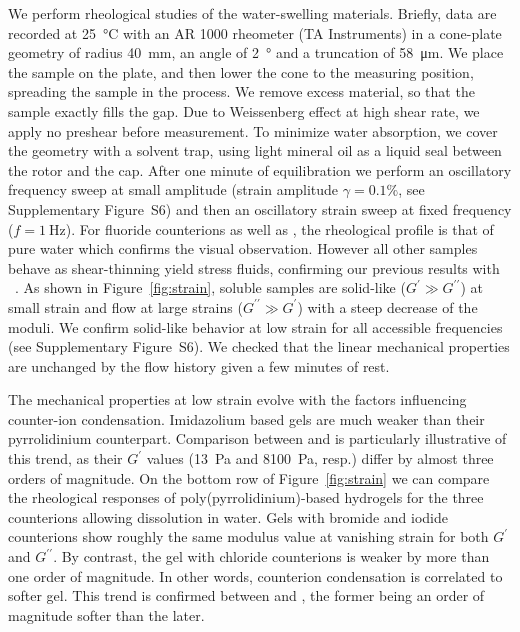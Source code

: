 \documentclass[twoside,twocolumn,9pt]{article}
\newcommand{\figSfrequency}{S6\xspace}
\begin{document}
We perform rheological studies of the water-swelling materials. Briefly, data are recorded at \SI{25}{\celsius} with an AR 1000 rheometer (TA Instruments) in a cone-plate geometry of radius \SI{40}{\milli\metre}, an angle of \SI{2}{\degree} and a truncation of \SI{58}{\micro\metre}\cite{Macosko1994,Larson1999}. We place the sample on the plate, and then lower the cone to the measuring position, spreading the sample in the process. We remove excess material, so that the sample exactly fills the gap. Due to Weissenberg effect at high shear rate, we apply no preshear before measurement. To minimize water absorption, we cover the geometry with a solvent trap, using light mineral oil as a liquid seal between the rotor and the cap. After one minute of equilibration we perform an oscillatory frequency sweep at small amplitude (strain amplitude $\gamma=0.1\%$, see Supplementary Figure~\figSfrequency) and then an oscillatory strain sweep at fixed frequency ($f=\SI{1}{\hertz}$). For fluoride counterions as well as , the rheological profile is that of pure water which confirms the visual observation. However all other samples behave as shear-thinning yield stress fluids, confirming our previous results with ~\cite{Srour2014}. As shown in Figure~\ref{fig:strain}, soluble samples are solid-like ($G^\prime \gg G^{\prime\prime}$) at small strain and flow at large strains ($G^{\prime\prime} \gg G^\prime$) with a steep decrease of the moduli. We confirm solid-like behavior at low strain for all accessible frequencies (see Supplementary Figure~\figSfrequency). We checked that the linear mechanical properties are unchanged by the flow history given a few minutes of rest.

The mechanical properties at low strain evolve with the factors influencing counter-ion condensation. Imidazolium based gels are much weaker than their pyrrolidinium counterpart. Comparison between  and  is particularly illustrative of this trend, as their $G^\prime$ values (\SI{13}{\pascal} and \SI{8100}{\pascal}, resp.) differ by almost three orders of magnitude. On the bottom row of Figure~\ref{fig:strain} we can compare the rheological responses of poly(pyrrolidinium)-based hydrogels for the three counterions allowing dissolution in water. Gels with bromide and iodide counterions show roughly the same modulus value at vanishing strain for both $G^\prime$ and $G^{\prime\prime}$. By contrast, the gel with chloride counterions is weaker by more than one order of magnitude. In other words, counterion condensation is correlated to softer gel. This trend is confirmed between  and , the former being an order of magnitude softer than the later.
\end{document}

